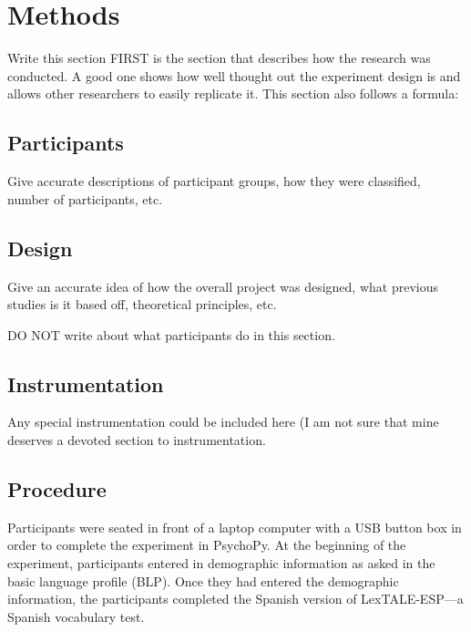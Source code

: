 
\section{Methods}

Write this section FIRST
is the section that describes how the research was conducted. A good one shows how well thought out the experiment design is and allows other researchers to easily replicate it. This section also follows a formula:

\subsection{Participants}

Give accurate descriptions of participant groups, how they were classified, number of participants, etc.


\subsection{Design}

Give an accurate idea of how the overall project was designed, what previous studies is it based off, theoretical principles, etc.

DO NOT write about what participants do in this section.

\subsection{Instrumentation}

Any special instrumentation could be included here (I am not sure that mine deserves a devoted section to instrumentation.



\subsection{Procedure}
Participants were seated in front of a laptop computer with a USB button box in order to complete the experiment in PsychoPy. At the beginning of the experiment, participants entered in demographic information as asked in the basic language profile (BLP). Once they had entered the demographic information, the participants completed the Spanish version of LexTALE-ESP---a Spanish vocabulary test. 

